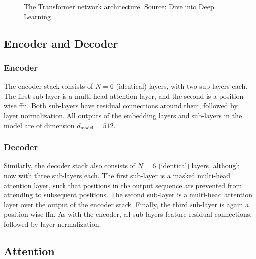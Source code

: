 \begin{figure}[ht!]
    \centering
    \def\svgscale{0.8}
    
    \caption[The Transformer network architecture]{The Transformer network architecture. Source: \href{https://d2l.ai/chapter_attention-mechanisms/transformer.html}{Dive into Deep Learning}}
    \label{fig:transformer_model_architecture}
\end{figure}

\subsection{Encoder and Decoder}
\label{subsec:encoder_decoder}

\subsubsection{Encoder}
\label{subsubsec:encoder}
The encoder stack consists of $N = 6$ (identical) layers, with two sub-layers each. The first sub-layer is a multi-head attention layer, and the second is a position-wise \gls{ffn}. Both sub-layers have residual connections around them, followed by layer normalization. All outputs of the embedding layers and sub-layers in the model are of dimension $d_{\text{model}} = 512$.

\subsubsection{Decoder}
\label{subsubsec:decoder}
Similarly, the decoder stack also consists of $N = 6$ (identical) layers, although now with three sub-layers each. The first sub-layer is a masked multi-head attention layer, such that positions in the output sequence are prevented from attending to subsequent positions. The second sub-layer is a multi-head attention layer over the output of the encoder stack. Finally, the third sub-layer is again a position-wise \gls{ffn}. As with the encoder, all sub-layers feature residual connections, followed by layer normalization.

\subsection{Attention}
\label{subsec:attention}

